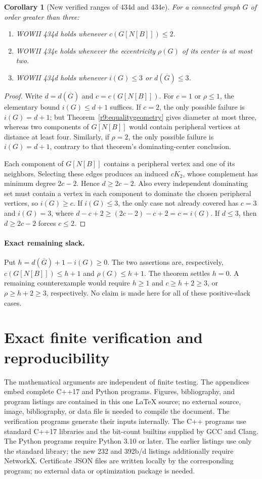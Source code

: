 \documentclass[11pt,a4paper]{article}
\newtheorem{corollary}[theorem]{Corollary}
\theoremstyle{remark}
\begin{document}
\begin{corollary}[New verified ranges of 434d and 434e]
\label{r9:ranges}
For a connected graph $G$ of order greater than three:
\begin{enumerate}
\item WOWII 434d holds whenever $c(G[N[B]])\le2$.
\item WOWII 434e holds whenever the eccentricity $\rho(G)$ of its
center is at most two.
\item WOWII 434d holds whenever $i(G)\le3$ or
$d(\overline G)\le3$.
\end{enumerate}
\end{corollary}
\begin{proof}
Write $d=d(\overline G)$ and $c=c(G[N[B]])$.
For $c=1$ or $\rho\le1$, the elementary bound $i(G)\le d+1$
suffices. If $c=2$, the only possible failure is $i(G)=d+1$;
but Theorem~\ref{r9:equalitygeometry} gives diameter at most three,
whereas two components of $G[N[B]]$ would contain peripheral
vertices at distance at least four. Similarly, if $\rho=2$,
the only possible failure is $i(G)=d+1$, contrary to that theorem's
dominating-center conclusion.

Each component of $G[N[B]]$ contains a peripheral vertex and one
of its neighbors. Selecting these edges produces an induced $cK_2$,
whose complement has minimum degree $2c-2$. Hence $d\ge2c-2$.
Also every independent dominating set must contain a vertex in each
component to dominate the chosen peripheral vertices, so $i(G)\ge c$.
If $i(G)\le3$, the only case not already covered has $c=3$ and
$i(G)=3$, where $d-c+2\ge(2c-2)-c+2=c=i(G)$.
If $d\le3$, then $d\ge2c-2$ forces $c\le2$.
\end{proof}

\paragraph{Exact remaining slack.}
Put $h=d(\overline G)+1-i(G)\ge0$. The two assertions are,
respectively, $c(G[N[B]])\le h+1$ and $\rho(G)\le h+1$.
The theorem settles $h=0$. A remaining counterexample would require
$h\ge1$ and $c\ge h+2\ge3$, or $\rho\ge h+2\ge3$, respectively.
No claim is made here for all of these positive-slack cases.

\section{Exact finite verification and reproducibility}\label{sec:checks}
The mathematical arguments are independent of finite testing. The appendices
embed complete C++17 and Python programs. Figures, bibliography, and program listings
are contained in this one \LaTeX{} source; no external source, image, bibliography,
or data file is needed to compile the document. The verification programs
generate their inputs internally. The C++ programs use standard C++17 libraries and the
bit-count builtins supplied by GCC and Clang. The Python programs require
Python 3.10 or later. The earlier listings use only the standard library;
the new 232 and 392b/d listings additionally require NetworkX. Certificate JSON
files are written locally by the corresponding program; no external data
or optimization package is needed.
\end{document}
